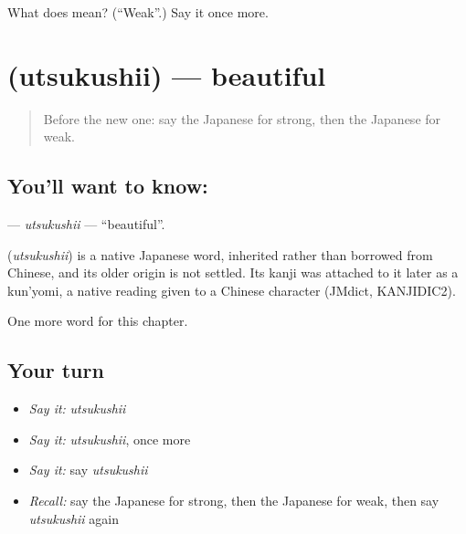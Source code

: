 \begin{tcolorbox}[breakable,colback=teal!4,colframe=teal!35!black,title={Before you move on}]
What does  mean? (\textquotedblleft{}Weak\textquotedblright{}.) Say it once more.
\end{tcolorbox}
\section[\texorpdfstring{\ja{うつくしい} (utsukushii)}{うつくしい (utsukushii)}]{ (utsukushii) — beautiful}

\label{lesson:JA-C51-utsukushii}



\begin{quote}
Before the new one: say the Japanese for strong, then the Japanese for weak.
\end{quote}

\subsection*{You'll want to know: }
\textbf{} — \emph{utsukushii} — \textquotedblleft{}beautiful\textquotedblright{}.

\begin{cousinweb}
\textbf{} (\emph{utsukushii}) is a native Japanese word, inherited rather than borrowed from Chinese, and its older origin is not settled. Its kanji was attached to it later as a kun'yomi, a native reading given to a Chinese character (JMdict, KANJIDIC2).
\end{cousinweb}

\begin{grammarlens}[title={What you've built}]
One more word for this chapter.
\end{grammarlens}

\subsection*{Your turn}
\begin{itemize}
\raggedright
  \item \emph{Say it:} \emph{utsukushii}
  \item \emph{Say it:} \emph{utsukushii}, once more
  \item \emph{Say it:} say \emph{utsukushii}
  \item \emph{Recall:} say the Japanese for strong, then the Japanese for weak, then say \emph{utsukushii} again
\end{itemize}

